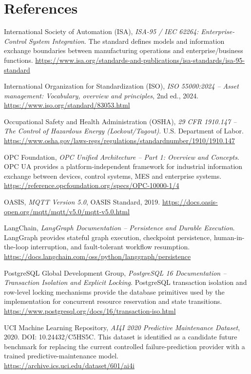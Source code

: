 \documentclass[10pt,twocolumn,a4paper]{article}
\begin{document}
\section*{References}
\begin{enumerate}[label={[\arabic*]},leftmargin=*,itemsep=3pt]
\footnotesize
\item International Society of Automation (ISA), \textit{ISA-95 / IEC 62264: Enterprise-Control System Integration}. The standard defines models and information exchange boundaries between manufacturing operations and enterprise/business functions. \url{https://www.isa.org/standards-and-publications/isa-standards/isa-95-standard}
\item International Organization for Standardization (ISO), \textit{ISO 55000:2024 -- Asset management: Vocabulary, overview and principles}, 2nd ed., 2024. \url{https://www.iso.org/standard/83053.html}
\item Occupational Safety and Health Administration (OSHA), \textit{29 CFR 1910.147 -- The Control of Hazardous Energy (Lockout/Tagout)}. U.S. Department of Labor. \url{https://www.osha.gov/laws-regs/regulations/standardnumber/1910/1910.147}
\item OPC Foundation, \textit{OPC Unified Architecture -- Part 1: Overview and Concepts}. OPC UA provides a platform-independent framework for industrial information exchange between devices, control systems, MES and enterprise systems. \url{https://reference.opcfoundation.org/specs/OPC-10000-1/4}
\item OASIS, \textit{MQTT Version 5.0}, OASIS Standard, 2019. \url{https://docs.oasis-open.org/mqtt/mqtt/v5.0/mqtt-v5.0.html}
\item LangChain, \textit{LangGraph Documentation -- Persistence and Durable Execution}. LangGraph provides stateful graph execution, checkpoint persistence, human-in-the-loop interruption, and fault-tolerant workflow resumption. \url{https://docs.langchain.com/oss/python/langgraph/persistence}
\item PostgreSQL Global Development Group, \textit{PostgreSQL 16 Documentation -- Transaction Isolation and Explicit Locking}. PostgreSQL transaction isolation and row-level locking mechanisms provide the database primitives used by the implementation for concurrent resource reservation and state transitions. \url{https://www.postgresql.org/docs/16/transaction-iso.html}
\item UCI Machine Learning Repository, \textit{AI4I 2020 Predictive Maintenance Dataset}, 2020. DOI: 10.24432/C5HS5C. This dataset is identified as a candidate future benchmark for replacing the current controlled failure-prediction provider with a trained predictive-maintenance model. \url{https://archive.ics.uci.edu/dataset/601/ai4i}
\end{enumerate}
\end{document}
